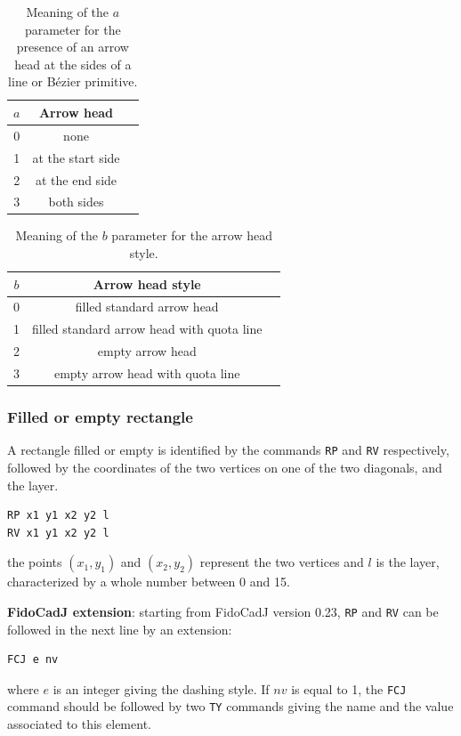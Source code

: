 \documentclass[10pt,a4paper,twoside]{scrreprt}
\newcommand{\toprule}{\hline}
\newcommand{\midrule}{\hline}
\newcommand{\bottomrule}{\hline}
\begin{document}
\begin{table}
\centering

\begin{tabular}{ccp{}}
\toprule
$a$ & Arrow head \\
\midrule
0   & none \\
1   & at the start side\\
2   & at the end side\\
3   & both sides\\
\bottomrule
\end{tabular}
\caption{Meaning of the $a$ parameter for the presence of an arrow head at the sides of a line or B\'ezier primitive.}
\label{tab_frecce_estremita}
\end{table}

\begin{table}
\centering
\begin{tabular}{ccp{}}
\toprule
$b$ & Arrow head style \\
\midrule
0   & filled standard arrow head \\
1   & filled standard arrow head with quota line \\
2   & empty arrow head\\
3   & empty arrow head with quota line\\
\bottomrule
\end{tabular}
\caption{Meaning of the $b$ parameter for the arrow head style.}
\label{tab_frecce_stile}
\end{table}

\subsubsection{Filled or empty rectangle}

A rectangle filled or empty is identified by the
commands \lstinline!RP! and \lstinline!RV!
respectively, followed by the coordinates of the two vertices on one
of the two diagonals, and the layer.
\begin{lstlisting}
RP x1 y1 x2 y2 l
RV x1 y1 x2 y2 l
\end{lstlisting} the points $(x_{1},y_{1})$
and $(x_{2},y_{2})$ represent the two vertices and $l$ is the layer,
characterized by a whole number between 0 and 15.

\textbf{FidoCadJ extension}: starting from FidoCadJ version 0.23,  \lstinline!RP! and \lstinline!RV! can be followed in the next line by an extension:
\begin{lstlisting}
FCJ e nv
\end{lstlisting}
where $e$ is an integer giving the dashing style. If $nv$ is equal to 1, the \lstinline!FCJ! command should be followed by two \lstinline!TY! commands giving the name and the value associated to this element.
\end{document}
